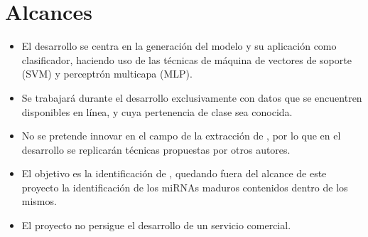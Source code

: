 %
%
%
\section{Alcances}
%
\begin{itemize}
\item
  El desarrollo se centra en la generación del modelo y su
  aplicación como clasificador, haciendo uso de las técnicas de
  máquina de vectores de soporte (SVM) y perceptrón multicapa (MLP).
\item
  Se trabajará durante el desarrollo exclusivamente con datos que se
  encuentren disponibles en línea, y cuya pertenencia de clase sea
  conocida.
\item
  No se pretende innovar en el campo de la extracción de ,
  por lo que en el desarrollo se replicarán técnicas propuestas
  por otros autores.
\item
  El objetivo es la identificación de , quedando fuera del
  alcance de este proyecto la identificación de los miRNAs maduros
  contenidos dentro de los mismos.
\item
  El proyecto no persigue el desarrollo de un servicio comercial.
\end{itemize}
%
